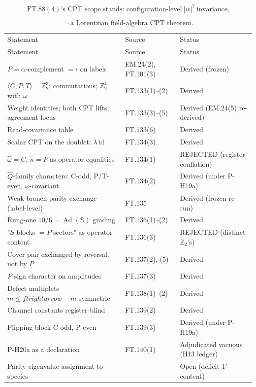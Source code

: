 \documentclass[11pt,openany]{report}
\theoremstyle{canonplain}
\theoremstyle{canondef}
\begin{document}
\[
\ \mathrm{FT.88}(4)\text{'s CPT scope stands: configuration-level}\ |w|^2\ \text{invariance},
\]

\[
\ \neg\ \text{a Lorentzian field-algebra CPT theorem}.
\]

{\small\setlength{\tabcolsep}{4pt}
\begin{longtable}{>{\raggedright\arraybackslash}p{}|>{\raggedright\arraybackslash}p{}|>{\raggedright\arraybackslash}p{}}
\toprule
Statement & Source & Status \\
\addlinespace[2pt]
\midrule
\endfirsthead
\toprule
Statement & Source & Status \\
\addlinespace[2pt]
\midrule
\endhead
\bottomrule
\endlastfoot
$P=\allowbreak \alpha$-complement $=\allowbreak \iota$ on labels & EM.24(2), FT.101(3) & Derived (frozen) \\
$\langle C,\allowbreak P,\allowbreak T\rangle=\allowbreak \mathbb Z_2^3$; commutations; $\mathbb Z_2^4$ with $\omega$ & FT.133(1)–(2) & Derived \\
Weight identities; both CPT lifts; agreement locus & FT.133(3)–(5) & Derived (EM.24(5) re-derived) \\
Read-covariance table & FT.133(6) & Derived \\
Scalar CPT on the doublet: $\lambda\,\allowbreak \mathrm{id}$ & FT.134(3) & Derived \\
$\hat\omega=\allowbreak C$, $\hat\kappa=\allowbreak P$ as operator equalities & FT.134(1) & REJECTED (register conflation) \\
$\hat Q$-family characters: C-odd, P/T-even, $\omega$-covariant & FT.134(2) & Derived (under P-H19a) \\
Weak-branch parity exchange (label-level) & FT.135 & Derived (frozen re-run) \\
Rung-one $10/6=\allowbreak \operatorname{Ad}(\mathbb S)$ grading & FT.136(1)–(2) & Derived \\
"$S$-blocks $=\allowbreak P$-sectors" as operator content & FT.136(3) & REJECTED (distinct $\mathbb Z_2$'s) \\
Cover pair exchanged by reversal, not by $P$ & FT.137(2), (5) & Derived \\
$P$ sign character on amplitudes & FT.137(3) & Derived \\
Defect multiplets $m\le\allowbreak ftrightarrow-m$ symmetric & FT.138(1)–(2) & Derived \\
Channel constants register-blind & FT.139(2) & Derived \\
Flipping block C-odd, P-even & FT.139(3) & Derived (under P-H19a) \\
P-H20a as a declaration & FT.140(1) & Adjudicated vacuous (H13 ledger) \\
Parity-eigenvalue assignment to species & — & Open (deficit 1$'$ content) \\
\end{longtable}
}
\end{document}
